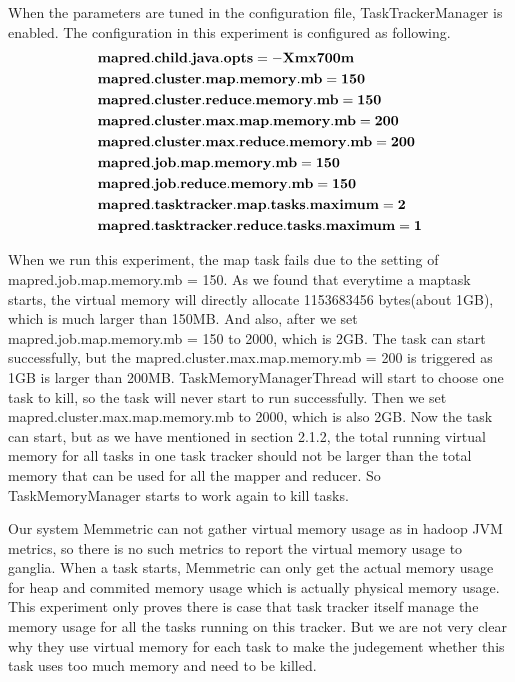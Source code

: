 When the parameters are tuned in the configuration file, TaskTrackerManager is enabled. The configuration in this experiment is configured as following.
\begin{align*}
&{\bf mapred.child.java.opts = -Xmx700m}\\
&{\bf mapred.cluster.map.memory.mb = 150}\\
&{\bf mapred.cluster.reduce.memory.mb = 150}\\
&{\bf mapred.cluster.max.map.memory.mb = 200}\\
&{\bf mapred.cluster.max.reduce.memory.mb = 200}\\
&{\bf mapred.job.map.memory.mb = 150}\\
&{\bf mapred.job.reduce.memory.mb = 150}\\
&{\bf mapred.tasktracker.map.tasks.maximum = 2}\\
&{\bf mapred.tasktracker.reduce.tasks.maximum = 1}\\
\end{align*}

When we run this experiment, the map task fails due to the setting of mapred.job.map.memory.mb = 150. As we found that everytime a maptask starts, the virtual memory will directly allocate 1153683456 bytes(about 1GB), which is much larger than 150MB. And also, after we set mapred.job.map.memory.mb = 150 to 2000, which is 2GB. The task can start successfully, but the mapred.cluster.max.map.memory.mb = 200 is triggered as 1GB is larger than 200MB. TaskMemoryManagerThread will start to choose one task to kill, so the task will never start to run successfully. Then we set mapred.cluster.max.map.memory.mb to 2000, which is also 2GB. Now the task can start, but as we have mentioned in section 2.1.2, the total running virtual memory for all tasks in one task tracker should not be larger than the total memory that can be used for all the mapper and reducer. So TaskMemoryManager starts to work again to kill tasks. 
\par
Our system Memmetric can not gather virtual memory usage as in hadoop JVM metrics, so there is no such metrics to report the virtual memory usage to ganglia. When a task starts, Memmetric can only get the actual memory usage for heap and commited memory usage which is actually physical memory usage. This experiment only proves there is case that task tracker itself manage the memory usage for all the tasks running on this tracker. But we are not very clear why they use virtual memory for each task to make the judegement whether this task uses too much memory and need to be killed. 